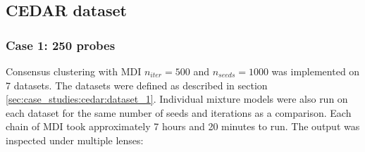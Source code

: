 \documentclass[12pt]{article} %
\begin{document}

	\subsection{CEDAR dataset} \label{sec:results:cedar}
	\subsubsection{Case 1: 250 probes} \label{sec:results:cedar:dataset_1}
	Consensus clustering with MDI $n_{iter}=500$ and $n_{seeds}=1000$ was implemented on 7 datasets. The datasets were defined as described in section \ref{sec:case_studies:cedar:dataset_1}. Individual mixture models were also run on each dataset for the same number of seeds and iterations as a comparison. Each chain of MDI took approximately 7 hours and 20 minutes to run. The output was inspected under multiple lenses: 
	
\end{document}
